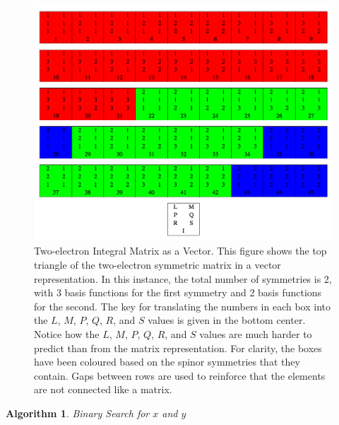 \documentclass[12pt]{report}
\newtheorem{algorithm}[theorem]{Algorithm}
\begin{document}
\begin{figure}[h!]
\includegraphics[width=1\textwidth]{Figures/eint2_vec.png}
\caption[Two-electron Integral Matrix as a Vector]
{Two-electron Integral Matrix as a Vector. This figure shows the top triangle of the two-electron symmetric matrix in a vector representation. In this instance, the total number of symmetries is 2, with 3 basis functions for the first symmetry and 2 basis functions for the second. The key for translating the numbers in each box into the $L$, $M$, $P$, $Q$, $R$, and $S$ values is given in the bottom center. Notice how the $L$, $M$, $P$, $Q$, $R$, and $S$ values are much harder to predict than from the matrix representation. For clarity, the boxes have been coloured based on the spinor symmetries that they contain. Gaps between rows are used to reinforce that the elements are not connected like a matrix.}
\label{fig:eint2vec}
\end{figure}


\begin{algorithm}
\caption{Binary Search for $x$ and $y$}
\label{bsxy}
\begin{algorithmic}

\ENDIF


		\ENDIF
	\ENDWHILE
\ENDIF

\end{algorithmic}
\end{algorithm}
\end{document}
